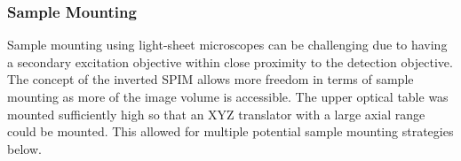 
\subsubsection{Sample Mounting}

Sample mounting using light-sheet microscopes can be challenging due to having a secondary excitation objective within close proximity to the detection objective.
The concept of the inverted SPIM \cite{Wu2011} allows more freedom in terms of sample mounting as more of the image volume is accessible.
The upper optical table was mounted sufficiently high so that an XYZ translator with a large axial range could be mounted.
This allowed for multiple potential sample mounting strategies below.



